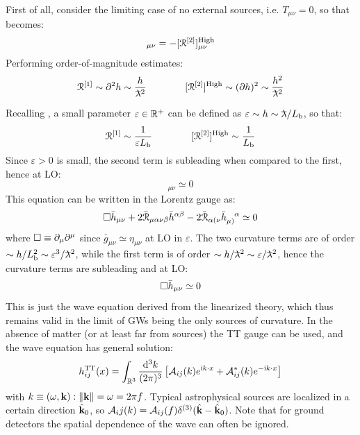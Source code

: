 First of all, consider the limiting case of no external sources, i.e. $ T_{\mu \nu} = 0 $, so that  becomes:
\begin{equation*}
  [\rr\od1]_{\mu \nu} = - [\rr\od2]_{\mu \nu}^\text{High}
\end{equation*}
Performing order-of-magnitude estimates:
\begin{equation*}
  \rr\od1 \sim \pa^2 h \sim \frac{h}{\lbar^2}
  \qquad \qquad
  [\rr\od2]^\text{High} \sim (\pa h)^2 \sim \frac{h^2}{\lbar^2}
\end{equation*}
Recalling , a small parameter $ \varepsilon \in \mathbb{R}^+ $ can be defined as $ \varepsilon \sim h \sim \lbar / L_\text{b} $, so that:
\begin{equation*}
  \EuScript{R}^{[1]} \sim \frac{1}{\varepsilon L_\text{b}}
  \qquad \qquad
  [\EuScript{R}^{[2]}]^\text{High} \sim \frac{1}{L_\text{b}}
\end{equation*}
Since $ \varepsilon > 0 $ is small, the second term is subleading when compared to the first, hence at LO:
\begin{equation}
  [\rr\od1]_{\mu \nu} \simeq 0
\end{equation}
This equation can be written in the Lorentz gauge as:
\begin{equation*}
  \dal \bar{h}_{\mu \nu} + 2 \bar{\rr}_{\mu \alpha \nu \beta} \bar{h}^{\alpha \beta} - 2 \bar{\rr}_{\alpha (\nu} \tensor{\bar{h}}{_{\mu)}^\alpha} \simeq 0
\end{equation*}
where $ \Box \equiv \partial_\mu \partial^\mu $ since $ \bar{g}_{\mu \nu} \simeq \eta_{\mu \nu} $ at LO in $ \varepsilon $.
The two curvature terms are of order $ \sim h / L_\text{b}^2 \sim \varepsilon^3 / \lbar^2 $, while the first term is of order $ \sim h / \lbar^2 \sim \varepsilon / \lbar^2 $, hence the curvature terms are subleading and at LO:
\begin{equation}
  \Box \bar{h}_{\mu \nu} \simeq 0
\end{equation}
This is just the wave equation derived from the linearized theory, which thus remains valid in the limit of GWs being the only sources of curvature. In the absence of matter (or at least far from sources) the TT gauge can be used, and the wave equation has general solution:
\begin{equation}
  h^\text{TT}_{ij}(x) = \int_{\mathbb{R}^3} \frac{\mathrm{d}^3k}{(2\pi)^3} \left[ \mathcal{A}_{ij}(k) e^{\mathrm{i} k \cdot x} + \mathcal{A}^*_{ij}(k) e^{-\mathrm{i} k \cdot x} \right]
\end{equation}
with $ k \equiv (\omega , \mathbf{k}) : \left\lVert\mathbf{k}\right\rVert = \omega = 2\pi f $. Typical astrophysical sources are localized in a certain direction $ \hat{\mathbf{k}}_0 $, so $ \mathcal{A}_ij(k) = \mathcal{A}_{ij}(f) \delta^{(3)}(\hat{\mathbf{k}} - \hat{\mathbf{k}}_0) $. Note that for ground detectors the spatial dependence of the wave can often be ignored.

